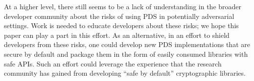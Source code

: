 At a higher level, there still seems to be a lack of understanding  in the broader developer community about the risks of using PDS in potentially adversarial settings. 
Work is needed to educate developers about these risks; we hope this paper can play a part in this effort. 
As an alternative, in an effort to shield developers from these risks, one could develop new PDS implementations that are secure by default and package them in the form of easily consumed libraries with safe APIs. Such an effort could leverage the experience that the research community has gained from developing ``safe by default'' cryptographic libraries.
